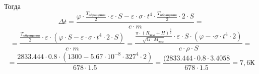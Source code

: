 \begin{enumerate}
    Тогда 
    $$\Delta t=\frac{\varphi\cdot\frac{T_\text{обращения}}{2}\cdot\varepsilon\cdot S-\varepsilon\cdot\sigma\cdot t^4\cdot\frac{T_\text{обращения}}{2}\cdot2\cdot S}{c\cdot m}=$$
    $$=\frac{\frac{T_\text{обращения}}{2}\cdot\varepsilon\cdot(\varphi\cdot S-\varepsilon\cdot\sigma\cdot t^4\cdot2\cdot S)}{c\cdot m}=\frac{\frac{\pi\cdot(R_\text{зем}+H)^{\frac{3}{2}}}{\sqrt{G\cdot M_\text{зем}}}\cdot\varepsilon\cdot S\cdot(\varphi-\cdot\sigma\cdot t^4\cdot2)}{c\cdot\rho\cdot S}=$$
    $$=\frac{2833.444\cdot0.8\cdot(1300-5.67\cdot10^{-8}\cdot327^4\cdot2)}{678\cdot1.5}=\frac{(2833.444\cdot0.8\cdot3.4058}{678\cdot1.5}=7,6 \text{К}$$
\end{enumerate}